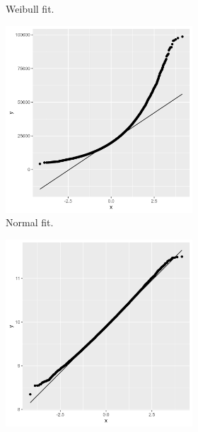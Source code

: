 \documentclass[11pt]{article}
\begin{document}
\begin{figure}[!h]
\begin{subfigure}{.49\textwidth}
\begin{subfigure}{.5\textwidth}
      \caption{Weibull fit.}
    \end{subfigure}
    \begin{subfigure}{.5\textwidth}
      \centering
      \includegraphics[width=.9\linewidth]{plots/claim_type1/qqplot_normal_small.png}
      \caption{Normal fit.}
    \end{subfigure}%
    \begin{subfigure}{.5\textwidth}
      \centering
      \includegraphics[width=.9\linewidth]{plots/claim_type1/qqplot_lognormality_small.png}

\end{subfigure}
\end{subfigure}
\end{figure}
\end{document}
